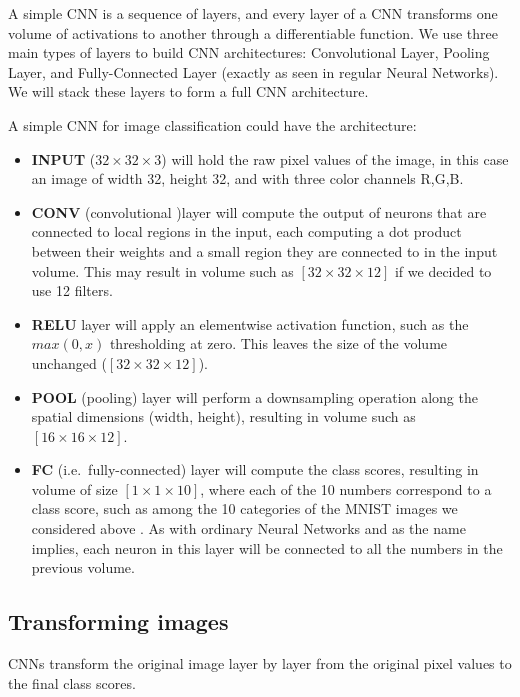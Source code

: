 \documentclass[%
oneside,                 %
final,                   %
10pt]{article}
\begin{document}
A simple CNN is a sequence of layers, and every layer of a CNN
transforms one volume of activations to another through a
differentiable function. We use three main types of layers to build
CNN architectures: Convolutional Layer, Pooling Layer, and
Fully-Connected Layer (exactly as seen in regular Neural Networks). We
will stack these layers to form a full CNN architecture.

A simple CNN for image classification could have the architecture:

\begin{itemize}
\item \textbf{INPUT} ($32\times 32 \times 3$) will hold the raw pixel values of the image, in this case an image of width 32, height 32, and with three color channels R,G,B.

\item \textbf{CONV} (convolutional )layer will compute the output of neurons that are connected to local regions in the input, each computing a dot product between their weights and a small region they are connected to in the input volume. This may result in volume such as $[32\times 32\times 12]$ if we decided to use 12 filters.

\item \textbf{RELU} layer will apply an elementwise activation function, such as the $max(0,x)$ thresholding at zero. This leaves the size of the volume unchanged ($[32\times 32\times 12]$).

\item \textbf{POOL} (pooling) layer will perform a downsampling operation along the spatial dimensions (width, height), resulting in volume such as $[16\times 16\times 12]$.

\item \textbf{FC} (i.e.~fully-connected) layer will compute the class scores, resulting in volume of size $[1\times 1\times 10]$, where each of the 10 numbers correspond to a class score, such as among the 10 categories of the MNIST images we considered above . As with ordinary Neural Networks and as the name implies, each neuron in this layer will be connected to all the numbers in the previous volume.
\end{itemize}

\noindent
\subsection{Transforming images}

CNNs transform the original image layer by layer from the original
pixel values to the final class scores. 
\end{document}
